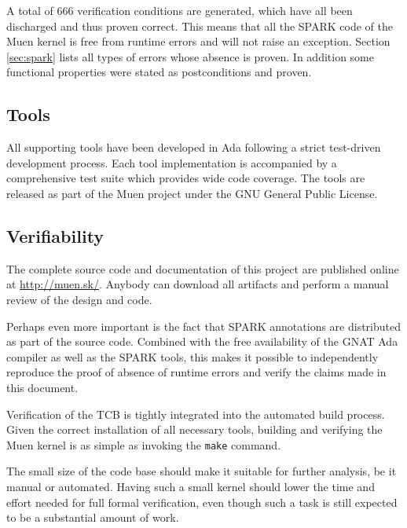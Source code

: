 A total of 666 verification conditions are generated, which have all been
discharged and thus proven correct. This means that all the SPARK code of the
Muen kernel is free from runtime errors and will not raise an exception.
Section \ref{sec:spark} lists all types of errors whose absence is proven. In
addition some functional properties were stated as postconditions and proven.

\subsection{Tools}
All supporting tools have been developed in Ada following a strict test-driven
development process. Each tool implementation is accompanied by a comprehensive
test suite which provides wide code coverage. The tools are released as part of
the Muen project under the GNU General Public License.

\subsection{Verifiability}
The complete source code and documentation of this project are published online
at \url{http://muen.sk/}. Anybody can download all artifacts and perform a
manual review of the design and code.

Perhaps even more important is the fact that SPARK annotations are distributed
as part of the source code. Combined with the free availability of the GNAT Ada
compiler as well as the SPARK tools, this makes it possible to independently
reproduce the proof of absence of runtime errors and verify the claims made in
this document.

Verification of the TCB is tightly integrated into the automated build process.
Given the correct installation of all necessary tools, building and verifying
the Muen kernel is as simple as invoking the \texttt{make} command.

The small size of the code base should make it suitable for further analysis, be
it manual or automated. Having such a small kernel should lower the time and
effort needed for full formal verification, even though such a task is still
expected to be a substantial amount of work.

